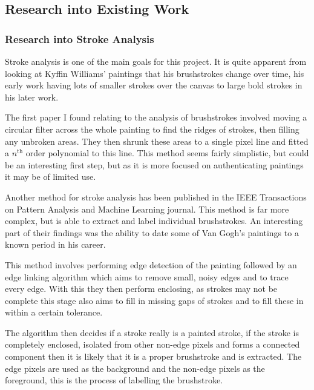 \documentclass[11pt,fleqn,twoside]{article}
\begin{document}
\clearpage
\subsection{Research into Existing Work}

\subsubsection{Research into Stroke Analysis}
Stroke analysis is one of the main goals for this project. It is quite apparent from looking at 
Kyffin Williams' paintings that his brushstrokes change over time, his early work having lots of
smaller strokes over the canvas to large bold strokes in his later work.

The first paper I found relating to the analysis of brushstrokes involved moving a circular filter
across the whole painting to find the ridges of strokes, then filling any unbroken areas. They then
shrunk these areas to a single pixel line and fitted a $n^{\text{th}}$ order polynomial to this
line\cite{Berezhnoy2005Authentic}. This method seems fairly simplistic, but could be an interesting
first step, but as it is more focused on authenticating paintings it may be of limited use.

Another method for stroke analysis has been published in the IEEE Transactions on Pattern Analysis
and Machine Learning journal. This method is far more complex, but is able to extract and label
individual brushstrokes. An interesting part of their findings was the ability to date some of Van
Gogh's paintings to a known period in his career\cite{Li2012Rhythmic}.

This method involves performing edge detection of the painting followed by an edge linking 
algorithm which aims to remove small, noisy edges and to trace every edge. With this they then
perform enclosing, as strokes may not be complete this stage also aims to fill in missing gaps of
strokes and to fill these in within a certain tolerance.

The algorithm then decides if a stroke really is a painted stroke, if the stroke is completely 
enclosed, isolated from other non-edge pixels and forms a connected component then it is likely 
that it is a proper brushstroke and is extracted. The edge pixels are used as the background and
the non-edge pixels as the foreground, this is the process of labelling the brushstroke.
\end{document}
